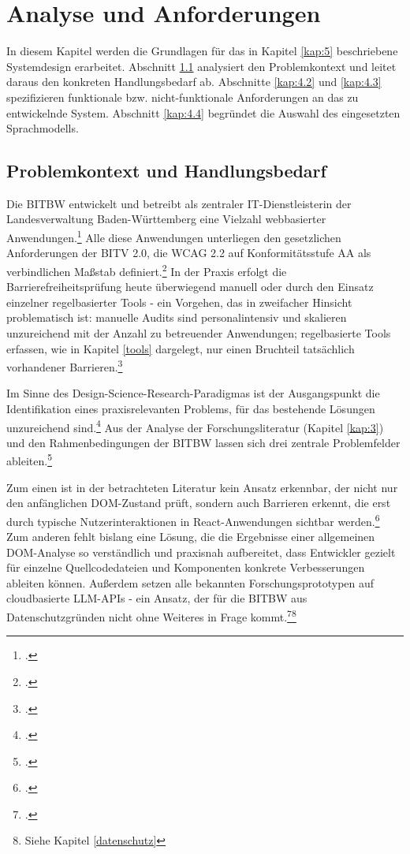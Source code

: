 \chapter{Analyse und Anforderungen} \label{kap:4}

In diesem Kapitel werden die Grundlagen für das in Kapitel \ref{kap:5} beschriebene Systemdesign erarbeitet. Abschnitt \ref{kap:4.1} analysiert den Problemkontext und leitet daraus den konkreten Handlungsbedarf ab. Abschnitte \ref{kap:4.2} und \ref{kap:4.3} spezifizieren funktionale bzw. nicht-funktionale Anforderungen an das zu entwickelnde System. Abschnitt \ref{kap:4.4} begründet die Auswahl des eingesetzten Sprachmodells.

\section{Problemkontext und Handlungsbedarf}\label{kap:4.1}

Die \ac{BITBW} entwickelt und betreibt als zentraler IT-Dienstleisterin der Landesverwaltung Baden-Württemberg eine Vielzahl webbasierter Anwendungen.\footcite[Vgl.][]{BITBW_2021} Alle diese Anwendungen unterliegen den gesetzlichen Anforderungen der \ac{BITV} 2.0, die \ac{WCAG} 2.2 auf Konformitätsstufe AA als verbindlichen Maßstab definiert.\footcite[Vgl.][]{BITV} In der Praxis erfolgt die Barrierefreiheitsprüfung heute überwiegend manuell oder durch den Einsatz einzelner regelbasierter Tools - ein Vorgehen, das in zweifacher Hinsicht problematisch ist: manuelle Audits sind personalintensiv und skalieren unzureichend mit der Anzahl zu betreuender Anwendungen; regelbasierte Tools erfassen, wie in Kapitel \ref{tools} dargelegt, nur einen Bruchteil tatsächlich vorhandener Barrieren.\footcite[Vgl.][S. 8-9]{tafreshipour_ma11y_2024}

Im Sinne des Design-Science-Research-Paradigmas ist der Ausgangspunkt die Identifikation eines praxisrelevanten Problems, für das bestehende Lösungen unzureichend sind.\footcite[Vgl.][S. 79]{hevner2004dsr} Aus der Analyse der Forschungsliteratur (Kapitel \ref{kap:3}) und den Rahmenbedingungen der \ac{BITBW} lassen sich drei zentrale Problemfelder ableiten.\footcite[Vgl.][S. 52--55]{peffers2007dsrm}

Zum einen ist in der betrachteten Literatur kein Ansatz erkennbar, der nicht nur den anfänglichen \ac{DOM}-Zustand prüft, sondern auch Barrieren erkennt, die erst durch typische Nutzerinteraktionen in React-Anwendungen sichtbar werden.\footcite[Vgl.][]{fathallah_accessguru_2025} Zum anderen fehlt bislang eine Lösung, die die Ergebnisse einer allgemeinen \ac{DOM}-Analyse so verständlich und praxisnah aufbereitet, dass Entwickler gezielt für einzelne Quellcodedateien und Komponenten konkrete Verbesserungen ableiten können. Außerdem setzen alle bekannten Forschungsprototypen auf cloudbasierte \ac{LLM}-\ac{API}s - ein Ansatz, der für die \ac{BITBW} aus Datenschutzgründen nicht ohne Weiteres in Frage kommt.\footcite[Vgl.][Art. 28, 44 ff.]{dsgvo2016}\footnote{Siehe Kapitel \ref{datenschutz}}

